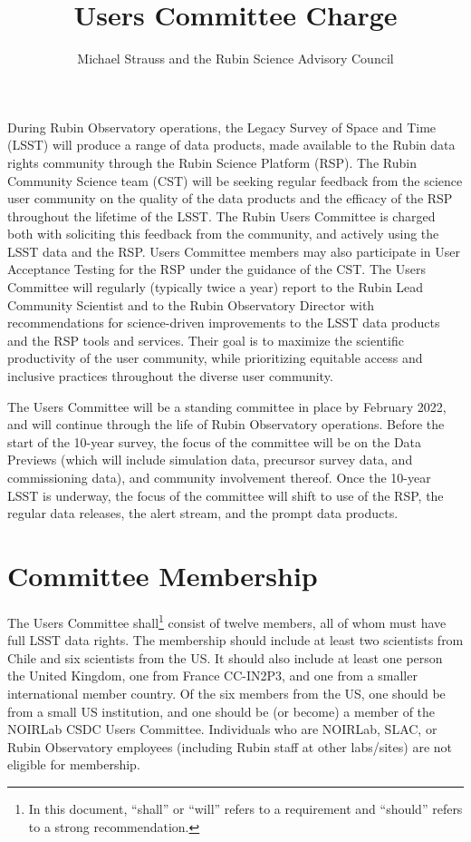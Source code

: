 \documentclass[OPS,toc]{lsstdoc}
\title{Users Committee Charge}
\author{%
Michael Strauss and the Rubin Science Advisory Council
}
\date{\vcsDate}
\begin{document}
\maketitle

During Rubin Observatory operations, the Legacy Survey of Space and Time (LSST) will produce a range of data products, made available to the Rubin data rights community through the Rubin Science Platform (RSP).
The Rubin Community Science team (CST) will be seeking regular feedback from the science user community on the quality of the data products and the efficacy of the RSP throughout the lifetime of the LSST.
The Rubin Users Committee is charged both with soliciting this feedback from the community, and actively using the LSST data and the RSP.
Users Committee members may also participate in User Acceptance Testing for the RSP under the guidance of the CST.
The Users Committee will regularly (typically twice a year) report to the Rubin Lead Community Scientist and to the Rubin Observatory Director with recommendations for science-driven improvements to the LSST data products and the RSP tools and services.
Their goal is to maximize the scientific productivity of the user community, while prioritizing equitable access and inclusive practices throughout the diverse user community. 

The Users Committee will be a standing committee in place by February 2022, and will continue through the life of Rubin Observatory operations.
Before the start of the 10-year survey, the focus of the committee will be on the Data Previews (which will include simulation data, precursor survey data, and commissioning data), and community involvement thereof.
Once the 10-year LSST is underway, the focus of the committee will shift to use of the RSP, the regular data releases, the alert stream, and the prompt data products.  

\section{Committee Membership}

The Users Committee shall\footnote{In this document, “shall” or “will” refers to a requirement and “should” refers to a strong recommendation.} consist of twelve members, all of whom must have full LSST data rights.
The membership should include at least two scientists from Chile and six scientists from the US.
It should also include at least one person the United Kingdom, one from France CC-IN2P3, and one from a smaller international member country.
Of the six members from the US, one should be from a small US institution, and one should be (or become) a member of the NOIRLab CSDC Users Committee.
Individuals who are NOIRLab, SLAC, or Rubin Observatory employees (including Rubin staff at other labs/sites) are not eligible for membership. 
\end{document}
